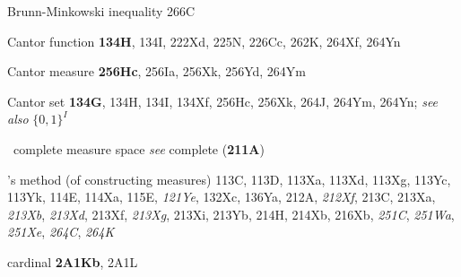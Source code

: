 



































Brunn-Minkowski inequality 266C













\indexmedskip















Cantor function {\bf 134H}, 134I,
  222Xd, 225N, 226Cc, 262K, 264Xf, 264Yn

Cantor measure {\bf 256Hc}, 256Ia, 256Xk, 256Yd, 264Ym


Cantor set {\bf 134G}, 134H, 134I, 134Xf,
  256Hc, 256Xk, 264J, 264Ym, 264Yn;
  {\it see also} $\{0,1\}^I$









\indexheader{\Caratheodory}
\Caratheodory\ complete measure space {\it see} complete ({\bf 211A})


\Caratheodory's method (of constructing measures) 113C, 113D, 113Xa, 113Xd,
113Xg, 113Yc, 113Yk, 114E, 114Xa, 115E, {\it 121Ye},
132Xc, 136Ya,
  212A, {\it 212Xf},
213C, 213Xa, {\it 213Xb}, {\it 213Xd}, 213Xf, {\it 213Xg}, 213Xi, 213Yb,
214H, 214Xb,
216Xb, {\it 251C}, {\it 251Wa}, {\it 251Xe}, {\it 264C}, {\it 264K}


cardinal {\bf 2A1Kb}, 2A1L





















